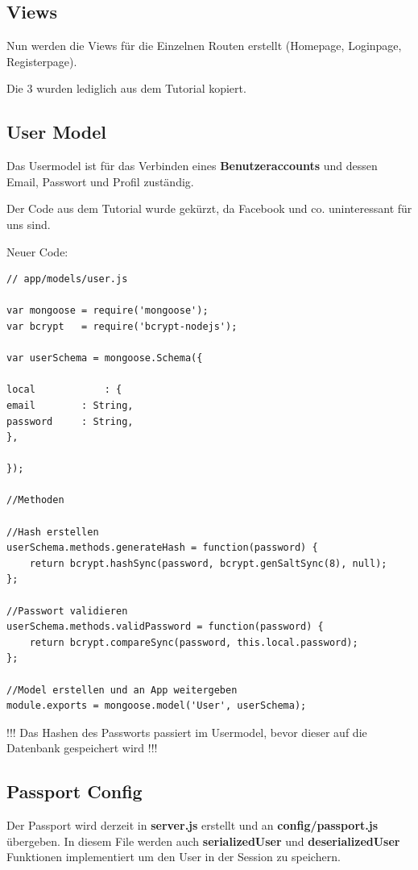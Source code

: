 \leftskip=0pt

\subsection{Views}
Nun werden die Views für die Einzelnen Routen erstellt (Homepage, Loginpage, Registerpage).

Die 3 wurden lediglich aus dem Tutorial kopiert.

\clearpage

\subsection{User Model}
Das Usermodel ist für das Verbinden eines \textbf{Benutzeraccounts} und dessen Email, Passwort und Profil zuständig.

Der Code aus dem Tutorial wurde gekürzt, da Facebook und co. uninteressant für uns sind.

Neuer Code:
\begin{lstlisting}
// app/models/user.js

var mongoose = require('mongoose');
var bcrypt   = require('bcrypt-nodejs');

var userSchema = mongoose.Schema({

local            : {
email        : String,
password     : String,
},

});

//Methoden

//Hash erstellen
userSchema.methods.generateHash = function(password) {
	return bcrypt.hashSync(password, bcrypt.genSaltSync(8), null);
};

//Passwort validieren
userSchema.methods.validPassword = function(password) {
	return bcrypt.compareSync(password, this.local.password);
};

//Model erstellen und an App weitergeben
module.exports = mongoose.model('User', userSchema);

\end{lstlisting}

!!! Das Hashen des Passworts passiert im Usermodel, bevor dieser auf die Datenbank gespeichert wird !!!

\subsection{Passport Config}

Der Passport wird derzeit in \textbf{server.js} erstellt und an \textbf{config/passport.js} übergeben. In diesem File werden auch \textbf{serializedUser} und \textbf{deserializedUser} Funktionen implementiert um den User in der Session zu speichern.

